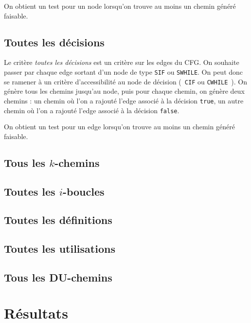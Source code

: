 On obtient un test pour un node lorsqu'on trouve au moins un chemin généré
faisable.

\subsection{Toutes les décisions}

Le critère \textit{toutes les décisions} est un critère sur les edges du CFG.
On souhaite passer par chaque edge sortant d'un node de type \texttt{SIF} ou
\texttt{SWHILE}. On peut donc se ramener à un critère d'accessibilité au node
de décision (~\texttt{CIF} ou \texttt{CWHILE}~). On génère tous les chemins
jusqu'au node, puis pour chaque chemin, on génère deux chemins : un chemin où
l'on a rajouté l'edge associé à la décision \texttt{true}, un autre chemin où
l'on a rajouté l'edge associé à la décision \texttt{false}.

On obtient un test pour un edge lorsqu'on trouve au moins un chemin généré
faisable.

\subsection{Tous les $k$-chemins}

\subsection{Toutes les $i$-boucles}

\subsection{Toutes les définitions}

\subsection{Toutes les utilisations}

\subsection{Tous les DU-chemins}

\section{Résultats}
